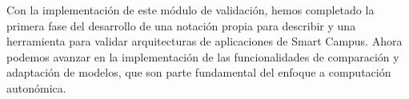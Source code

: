 Con la implementación de este módulo de validación, hemos completado la primera fase del desarrollo de una notación propia para describir y una herramienta para validar arquitecturas de aplicaciones de Smart Campus. Ahora podemos avanzar en la implementación de las funcionalidades de comparación y adaptación de modelos, que son parte fundamental del enfoque a computación autonómica. 


